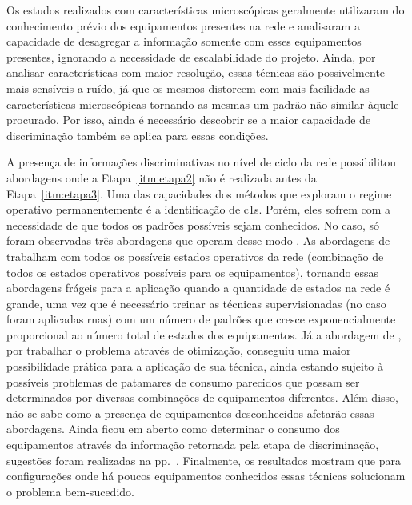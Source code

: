 Os estudos realizados com características microscópicas geralmente
utilizaram do conhecimento prévio dos equipamentos presentes na rede e
analisaram a capacidade de desagregar a informação somente com esses
equipamentos presentes, ignorando a necessidade de escalabilidade do
projeto. Ainda, por analisar características com maior resolução,
essas técnicas são possivelmente mais sensíveis a ruído, já que os
mesmos distorcem com mais facilidade as características microscópicas
tornando as mesmas um padrão não similar àquele procurado. Por isso,
ainda é necessário descobrir se a maior capacidade de discriminação
também se aplica para essas condições.

A presença de informações discriminativas no nível de ciclo da rede
possibilitou abordagens onde a Etapa~\ref{itm:etapa2} não é realizada
antes da Etapa~\ref{itm:etapa3}. Uma das capacidades dos métodos que
exploram o regime operativo permanentemente é a identificação de
\glspl{c1}. Porém, eles sofrem com a necessidade de que todos os
padrões possíveis sejam conhecidos. No caso, só foram observadas três
abordagens que operam desse modo \cite{nilm_srinivasan_nn_2006_27,
nilm_itajuba_rodrigues,nilm_suzuki_2011_35}. As abordagens de
\cite{nilm_srinivasan_nn_2006_27,nilm_itajuba_rodrigues} trabalham com
todos os possíveis estados operativos da rede (combinação de todos os
estados operativos possíveis para os equipamentos), tornando essas
abordagens frágeis para a aplicação quando a quantidade de estados na
rede é grande, uma vez que é necessário treinar as técnicas
supervisionadas (no caso foram aplicadas \glspl{rna}) com um número de
padrões que cresce exponencialmente proporcional ao número total de
estados dos equipamentos. Já a abordagem de \cite{nilm_suzuki_2011_35},
por trabalhar o problema através de otimização, conseguiu uma maior
possibilidade prática para a aplicação de sua técnica, ainda estando
sujeito à possíveis problemas de patamares de consumo parecidos que
possam ser determinados por diversas combinações de equipamentos
diferentes. Além disso, não se sabe como a presença de equipamentos
desconhecidos afetarão essas abordagens. Ainda ficou em aberto como
determinar o consumo dos equipamentos através da informação retornada
pela etapa de discriminação, sugestões foram realizadas na
pp.~\pageref{text:transf_info_discr_energia}.  Finalmente, os
resultados mostram que para configurações onde há poucos equipamentos
conhecidos essas técnicas solucionam o problema bem-sucedido.

